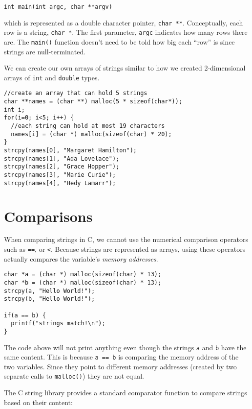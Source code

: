 \texttt{int main(int argc, char **argv)}

which is represented as a double character pointer, 
\texttt{char **}.  Conceptually, each row is
a string, \texttt{char *}.  The first parameter,
\texttt{argc} indicates how many rows there are.
The \texttt{main()} function doesn't need to
be told how big each ``row'' is since strings are 
null-terminated.

We can create our own arrays of strings similar to
how we created 2-dimensional arrays of \texttt{int}
and \texttt{double} types.

\begin{verbatim}
//create an array that can hold 5 strings
char **names = (char **) malloc(5 * sizeof(char*));
int i;
for(i=0; i<5; i++) {
  //each string can hold at most 19 characters
  names[i] = (char *) malloc(sizeof(char) * 20);
}
strcpy(names[0], "Margaret Hamilton");
strcpy(names[1], "Ada Lovelace");
strcpy(names[2], "Grace Hopper");
strcpy(names[3], "Marie Curie");
strcpy(names[4], "Hedy Lamarr");
\end{verbatim}

\section{Comparisons}

When comparing strings in C, we cannot use the numerical
comparison operators such as \texttt{==}, or
\texttt{<}.  Because strings are represented as
arrays, using these operators actually compares the
variable's \emph{memory addresses}.

\begin{verbatim}
char *a = (char *) malloc(sizeof(char) * 13);
char *b = (char *) malloc(sizeof(char) * 13);
strcpy(a, "Hello World!");
strcpy(b, "Hello World!");

if(a == b) {
  printf("strings match!\n");
}
\end{verbatim}

The code above will not print anything even though
the strings \texttt{a} and \texttt{b}
have the same content.  This is because \texttt{a == b}
is comparing the memory address of the two variables.
Since they point to different memory addresses 
(created by two separate calls to \texttt{malloc()})
they are not equal.

The C string library provides a standard \gls{comparator}
function to compare strings based on their content:

